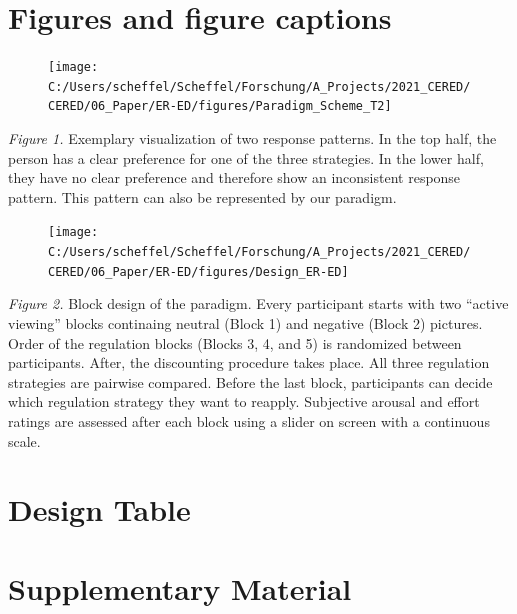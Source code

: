 \documentclass[
  english,
  man,floatsintext]{apa6}
\begin{document}
\hypertarget{figures-and-figure-captions}{%
\section{Figures and figure captions}\label{figures-and-figure-captions}}

\newpage
\begin{figure}
\texttt{[image: C:/Users/scheffel/Scheffel/Forschung/A\_Projects/2021\_CERED/CERED/06\_Paper/ER-ED/figures/Paradigm\_Scheme\_T2]} \caption{ }\label{fig:ResponsePatternsAppendix}
\end{figure}

\emph{Figure 1.}
Exemplary visualization of two response patterns.
In the top half, the person has a clear preference for one of the three strategies.
In the lower half, they have no clear preference and therefore show an inconsistent response pattern.
This pattern can also be represented by our paradigm.

\begin{figure}[H]
\texttt{[image: C:/Users/scheffel/Scheffel/Forschung/A\_Projects/2021\_CERED/CERED/06\_Paper/ER-ED/figures/Design\_ER-ED]} \caption{ }\label{fig:DesignEREDappendix}
\end{figure}

\emph{Figure 2.}
Block design of the paradigm.
Every participant starts with two ``active viewing'' blocks continaing neutral (Block 1) and negative (Block 2) pictures.
Order of the regulation blocks (Blocks 3, 4, and 5) is randomized between participants. After, the discounting procedure takes place.
All three regulation strategies are pairwise compared. Before the last block, participants can decide which regulation strategy they want to reapply.
Subjective arousal and effort ratings are assessed after each block using a slider on screen with a continuous scale.

\hypertarget{DesignTable}{%
\section{Design Table}\label{DesignTable}}



\newpage

\hypertarget{SupplementaryMaterial}{%
\section{Supplementary Material}\label{SupplementaryMaterial}}
\end{document}
